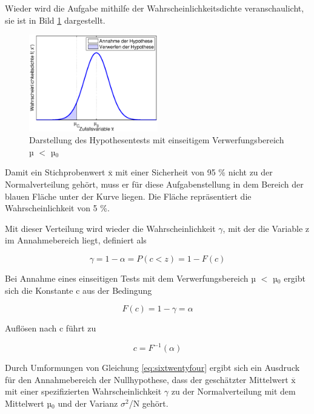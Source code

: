 \noindent Wieder wird die Aufgabe mithilfe der Wahrscheinlichkeitsdichte veranschaulicht, sie ist in Bild \ref{fig:HypothesentestLinkerVerwerfungsbereich} dargestellt.

\noindent 
\begin{figure}[H]
  \centerline{\includegraphics[width=0.5\textwidth]{Kapitel6/Bilder/image5}}
  \caption{Darstellung des Hypothesentests mit einseitigem Verwerfungsbereich µ $\mathrm{<}$ µ$_{0}$}
  \label{fig:HypothesentestLinkerVerwerfungsbereich}
\end{figure}

\noindent Damit ein Stichprobenwert $\overline{\mathrm{x}}$ mit einer Sicherheit von 95 \% nicht zu der Normalverteilung geh\"{o}rt, muss er f\"{u}r diese Aufgabenstellung in dem Bereich der blauen Fl\"{a}che unter der Kurve liegen. Die Fl\"{a}che repr\"{a}sentiert die Wahrscheinlichkeit von 5 \%. \newline

\noindent Mit dieser Verteilung wird wieder die Wahrscheinlichkeit $\gamma$, mit der die Variable z im Annahmebereich liegt, definiert als

\begin{equation}\label{eq:sixtwentyfour}
\gamma =1-\alpha =P(c<z)=1-F(c)
\end{equation}

\noindent Bei Annahme eines einseitigen Tests mit dem Verwerfungsbereich µ $\mathrm{<}$ µ$_{0}$ ergibt sich die Konstante c aus der Bedingung

\begin{equation}\label{eq:sixtwentyfive}
F(c)=1-\gamma =\alpha
\end{equation}

\noindent Aufl\"{o}sen nach c f\"{u}hrt zu

\begin{equation}\label{eq:sixtwentysix}
c=F^{-1} (\alpha)
\end{equation}

\noindent Durch Umformungen von Gleichung \eqref{eq:sixtwentyfour} ergibt sich ein Ausdruck f\"{u}r den Annahmebereich der Nullhypothese, dass der gesch\"{a}tzter Mittelwert $\overline{\mathrm{x}}$ mit einer spezifizierten Wahrscheinlichkeit $\gamma$ zu der Normalverteilung mit dem Mittelwert µ$_{0}$ und der Varianz $\sigma^{2}$/N geh\"{o}rt.

